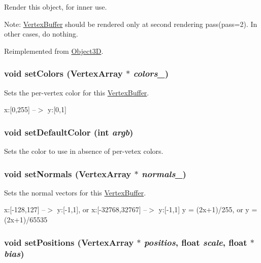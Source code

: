 Render this object, for inner use.

Note: \hyperlink{classm3g_1_1VertexBuffer}{VertexBuffer} should be rendered only at second rendering pass(pass=2). In other cases, do nothing. 

Reimplemented from \hyperlink{classm3g_1_1Object3D_8babc8a79b78615da51161e94029eea9}{Object3D}.\hypertarget{classm3g_1_1VertexBuffer_e5a5933252e3ec3afa0a83698b5b3521}{
\subsubsection[{setColors}]{\setlength{\rightskip}{0pt plus 5cm}void setColors ({\bf VertexArray} $\ast$ {\em colors\_\-})}}
\label{classm3g_1_1VertexBuffer_e5a5933252e3ec3afa0a83698b5b3521}


Sets the per-vertex color for this \hyperlink{classm3g_1_1VertexBuffer}{VertexBuffer}.

x:\mbox{[}0,255\mbox{]} --$>$ y:\mbox{[}0,1\mbox{]} \hypertarget{classm3g_1_1VertexBuffer_57fc3a141397f1287061a204c128c1b3}{
\subsubsection[{setDefaultColor}]{\setlength{\rightskip}{0pt plus 5cm}void setDefaultColor (int {\em argb})}}
\label{classm3g_1_1VertexBuffer_57fc3a141397f1287061a204c128c1b3}


Sets the color to use in absence of per-vetex colors. \hypertarget{classm3g_1_1VertexBuffer_4aabe6277538d5aa8285759dab85002a}{
\subsubsection[{setNormals}]{\setlength{\rightskip}{0pt plus 5cm}void setNormals ({\bf VertexArray} $\ast$ {\em normals\_\-})}}
\label{classm3g_1_1VertexBuffer_4aabe6277538d5aa8285759dab85002a}


Sets the normal vectors for this \hyperlink{classm3g_1_1VertexBuffer}{VertexBuffer}.

x:\mbox{[}-128,127\mbox{]} --$>$ y:\mbox{[}-1,1\mbox{]}, or x:\mbox{[}-32768,32767\mbox{]} --$>$ y:\mbox{[}-1,1\mbox{]} y = (2x+1)/255, or y = (2x+1)/65535 \hypertarget{classm3g_1_1VertexBuffer_527460407f488d5128bae7d0adb6da43}{
\subsubsection[{setPositions}]{\setlength{\rightskip}{0pt plus 5cm}void setPositions ({\bf VertexArray} $\ast$ {\em positios}, \/  float {\em scale}, \/  float $\ast$ {\em bias})}}
\label{classm3g_1_1VertexBuffer_527460407f488d5128bae7d0adb6da43}


